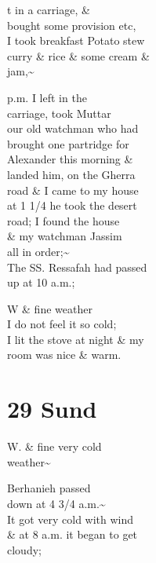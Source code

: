 \documentclass{report}
\begin{document}

	\par{
 	t in a carriage, \&\ \\bought some provision etc,\ \\I took breakfast Potato stew\ \\curry \& rice \& some cream \&\ \\jam,\~{}\ \\
	}

	\par{
 	p.m. I left in the\ \\carriage, took Muttar\ \\our old watchman who had\ \\brought one partridge for\ \\Alexander this morning \&\ \\landed him, on the Gherra\ \\road \& I came to my house\ \\at 1 1/4 he took the desert\ \\road; I found the house\ \\\& my watchman Jassim\ \\all in order;\~{}\ \\The SS. Ressafah had passed\ \\up at 10 a.m.;\ \\
	}

	\par{
 	W \& fine weather\ \\I do not feel it so cold;\ \\I lit the stove at night \& my\ \\room was nice \& warm.\ \\
	}

	\chapter{29 Sund\ \\}

	\par{
 	
	}

	\par{
 	W. \& fine very cold\ \\weather\~{}\ \\
	}

	\par{
 	Berhanieh passed\ \\down at 4 3/4 a.m.\~{}\ \\It got very cold with wind\ \\\& at 8 a.m. it began to get\ \\cloudy;\ \\
	}
\end{document}
